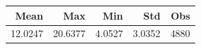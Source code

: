\begin{tabular}{rrrrr}
\toprule
Mean & Max & Min & Std & Obs \\
\midrule
12.0247 & 20.6377 & 4.0527 & 3.0352 & 4880 \\
\bottomrule
\end{tabular}
